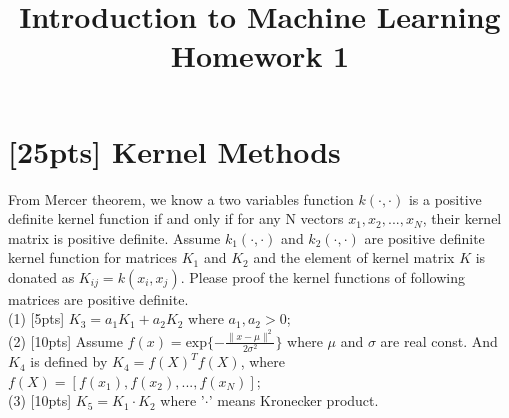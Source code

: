 \documentclass{article}
\title{Introduction to Machine Learning\\Homework 1}
\begin{document}
	\maketitle
	\section*{[25pts] Kernel Methods}
	From Mercer theorem, we know a two variables function $k(\cdot,\cdot)$ is a positive definite kernel function if and only if for any N vectors $x_1,x_2,...,x_N$, their kernel matrix is positive definite. Assume $k_1(\cdot,\cdot)$ and $k_2(\cdot,\cdot)$ are positive definite kernel function for matrices $K_1$ and $K_2$ and the element of kernel matrix $K$ is donated as $K_{ij}=k(x_i,x_j)$. Please proof the kernel functions of following matrices are positive definite.\\
    (1) [5pts] $K_3=a_1 K_1+a_2 K_2$ where $a_1,a_2>0$;\\
    (2) [10pts] Assume $f(x)=\text{exp}\{-\frac{\|x-\mu\|^2}{2\sigma^2}\}$ where $\mu$ and $\sigma$ are real const. And $K_4$ is defined by $K_4=f(X)^T f(X)$, where $f(X)=[f(x_1),f(x_2),...,f(x_N)]$;\\
    (3) [10pts] $K_5=K_1\cdot K_2$ where '$\cdot$' means Kronecker product.\\
	
\end{document}

